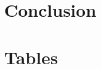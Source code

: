 \documentclass [11pt, proquest] {uwthesis}[2020/02/24]
\begin{document}

\chapter{Conclusion}


%
%
\nocite{*}   %


%
%
\appendix
\raggedbottom\sloppy
 
 
\chapter{Tables}
 

\end{document}
